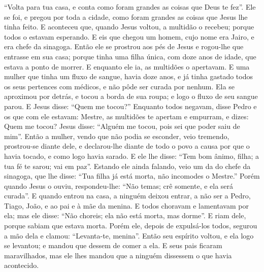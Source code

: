 {  “Volta para tua casa, e conta como foram grandes as coisas que Deus te fez”. Ele se foi, e pregou por toda a cidade, como foram grandes as coisas que Jesus lhe tinha feito.
  E aconteceu que, quando Jesus voltou, a multidão o recebeu; porque todos o estavam esperando.
  E eis que chegou um homem, cujo nome era Jairo, e era chefe da sinagoga. Então ele se prostrou aos pés de Jesus e rogou-lhe que entrasse em sua casa;
  porque tinha uma filha única, com doze anos de idade, que estava a ponto de morrer. E enquanto ele ia, as multidões o apertavam.
  E uma mulher que tinha um fluxo de sangue, havia doze anos, e já tinha gastado todos os seus pertences com médicos, e não pôde ser curada por nenhum.
  Ela se aproximou
{} por detrás, e tocou a borda de sua roupa; e logo o fluxo de seu sangue parou.
  E Jesus disse: “Quem me tocou?” Enquanto todos negavam, disse Pedro e os que com ele estavam: Mestre, as multidões te apertam e empurram, e dizes: Quem me tocou?
  Jesus disse: “Alguém me tocou, pois sei que poder saiu de mim”.
  Então a mulher, vendo que não podia se esconder, veio tremendo, prostrou-se diante dele, e declarou-lhe diante de todo o povo a causa por que o havia tocado, e como logo havia sarado.
  E ele lhe disse: “Tem bom ânimo, filha; a tua fé te sarou; vai em paz”.
  Estando ele ainda falando, veio um da
{} do chefe da sinagoga, que lhe disse: “Tua filha já está morta, não incomodes o Mestre.”
  Porém quando Jesus o ouviu, respondeu-lhe: “Não temas; crê somente, e ela será curada”.
  E quando entrou na casa, a ninguém deixou entrar, a não ser a Pedro, Tiago, João, e ao pai e à mãe da menina.
  E todos choravam e lamentavam por ela; mas ele disse: “Não choreis; ela não está morta, mas dorme”.
  E riam dele, porque sabiam que estava morta.
  Porém ele, depois de expulsá-los todos, segurou a mão dela e clamou: “Levanta-te, menina”.
  Então seu espírito voltou, e ela logo se levantou; e
{} mandou que dessem de comer a ela.
  E seus pais ficaram maravilhados, mas ele lhes mandou que a ninguém dissessem o que havia acontecido.
\par }

